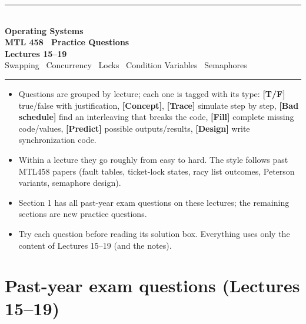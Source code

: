 \documentclass[11pt,a4paper]{article}
\begin{document}
\begin{center}
{\color{rulegray}\rule{\textwidth}{1.1pt}}\\[0.45em]
{\LARGE\bfseries Operating Systems}\\[0.25em]
{\Large\bfseries MTL 458 \textperiodcentered\ Practice Questions}\\[0.35em]
{\LARGE\bfseries Lectures 15--19}\\[0.2em]
{\large Swapping \textperiodcentered\ Concurrency \textperiodcentered\ Locks
\textperiodcentered\ Condition Variables \textperiodcentered\ Semaphores}\\[0.35em]
{\color{rulegray}\rule{\textwidth}{1.1pt}}
\end{center}

\vspace{0.4em}
\begin{keybox}
\begin{itemize}
  \item Questions are grouped by lecture; each one is tagged with its type:
        \textbf{[T/F]} true/false with justification, \textbf{[Concept]},
        \textbf{[Trace]} simulate step by step, \textbf{[Bad schedule]}
        find an interleaving that breaks the code, \textbf{[Fill]} complete
        missing code/values, \textbf{[Predict]} possible outputs/results,
        \textbf{[Design]} write synchronization code.
  \item Within a lecture they go roughly from easy to hard. The style follows
        past MTL458 papers (fault tables, ticket-lock states, racy list
        outcomes, Peterson variants, semaphore design).
  \item Section 1 has all past-year exam questions on these lectures; the remaining sections are new practice questions.
  \item Try each question before reading its solution box. Everything uses
        only the content of Lectures 15--19 (and the notes).
\end{itemize}
\end{keybox}

\tableofcontents
\vspace{0.6em}
\noindent{\color{rulegray}\rule{\textwidth}{0.4pt}}

\section{Past-year exam questions (Lectures 15--19)}
\end{document}
